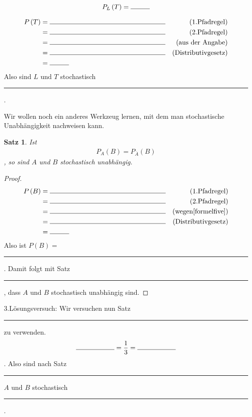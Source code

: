\documentclass{article}
\newtheorem{theorem}{Satz}
\begin{document}
$$P_L\left(T\right) = \rule{1cm}{.4pt}$$

\begin{align}
P\left(T\right) &= \rule{6cm}{.4pt} & \text{(1.Pfadregel}) \notag \\
&= \rule{6cm}{.4pt} &\text{(2.Pfadregel)} \notag \\
&= \rule{6cm}{.4pt} &\text{(aus der Angabe)} \notag \\
&= \rule{6cm}{.4pt} &\text{(Distributivgesetz)} \notag \\
&= \rule{1cm}{.4pt} \notag
\end{align}
Also sind $L$ und $T$ stochastisch \rule{6cm}{.4pt} .

Wir wollen noch ein anderes Werkzeug lernen, mit dem man stochastische Unabh\"angigkeit nachweisen kann.
\begin{theorem}
  Ist 
  \begin{align}
  P_A\left(B\right) = P_{\overline{A}}\left(B\right) \label{formelfive}
  \end{align}, so sind $A$ und $B$ stochastisch unabh\"angig.
  \label{thm:bar}
\end{theorem}
\begin{proof}
 \begin{align}
 P\left(B\right) &= \rule{6cm}{.4pt} & \text{(1.Pfadregel}) \notag \\
&= \rule{6cm}{.4pt} &\text{(2.Pfadregel)} \notag \\
&= \rule{6cm}{.4pt} &\text{(wegen} \eqref{formelfive} \text{)} \notag \\
&= \rule{6cm}{.4pt} &\text{(Distributivgesetz)} \notag \\
&= \rule{1cm}{.4pt} \notag
 \end{align}
 Also ist $P\left(B\right)=$ \rule{1cm}{.4pt}. Damit folgt mit Satz \rule{1cm}{.4pt}, dass $A$ und $B$ stochastisch unabh\"angig sind.
 
\end{proof}

3.L\"osungsversuch: Wir versuchen nun Satz \rule{1cm}{.4pt} zu verwenden.
$$ \rule{2cm}{.4pt} = \frac{1}{3} = \rule{2cm}{.4pt} $$.
Also sind nach Satz \rule{1cm}{.4pt} $A$ und $B$ stochastisch \rule{6cm}{.4pt}.
\end{document}

